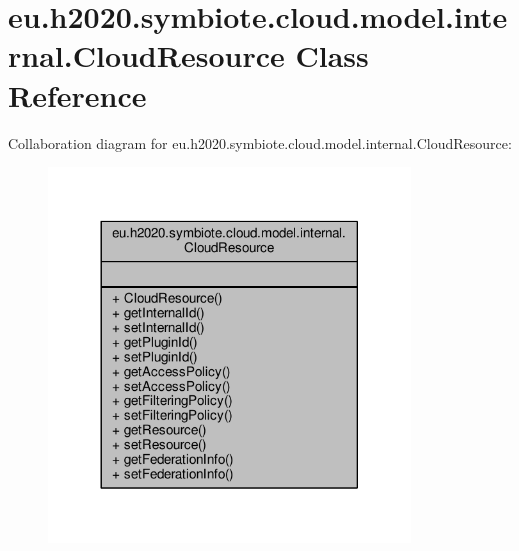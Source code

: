 \hypertarget{classeu_1_1h2020_1_1symbiote_1_1cloud_1_1model_1_1internal_1_1CloudResource}{}\section{eu.\+h2020.\+symbiote.\+cloud.\+model.\+internal.\+Cloud\+Resource Class Reference}
\label{classeu_1_1h2020_1_1symbiote_1_1cloud_1_1model_1_1internal_1_1CloudResource}


Collaboration diagram for eu.\+h2020.\+symbiote.\+cloud.\+model.\+internal.\+Cloud\+Resource\+:
\nopagebreak
\begin{figure}[H]
\begin{center}
\leavevmode
\includegraphics[width=272pt]{classeu_1_1h2020_1_1symbiote_1_1cloud_1_1model_1_1internal_1_1CloudResource__coll__graph}
\end{center}
\end{figure}
